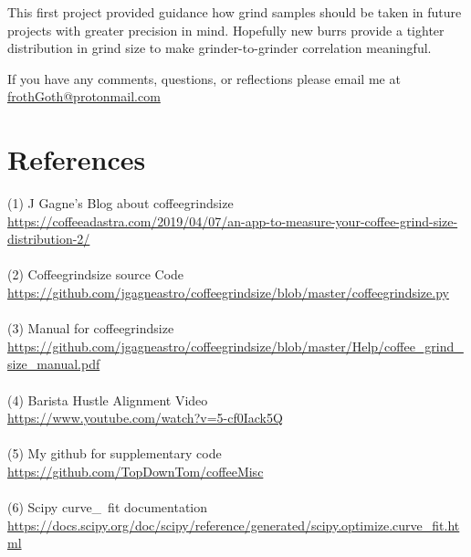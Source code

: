 \documentclass[10pt,a4paper,twocolumn,notitlepage]{article}
\begin{document}
This first project provided guidance how grind samples should be taken in future projects with greater precision in mind. Hopefully new burrs provide a tighter distribution in grind size to make grinder-to-grinder correlation meaningful. 

If you have any comments, questions, or reflections please email me at \url{frothGoth@protonmail.com}

\section{References}
(1) J Gagne's Blog about coffeegrindsize\\
\url{https://coffeeadastra.com/2019/04/07/an-app-to-measure-your-coffee-grind-size-distribution-2/}\\\\
(2) Coffeegrindsize source Code\\
\url{https://github.com/jgagneastro/coffeegrindsize/blob/master/coffeegrindsize.py}\\\\
(3) Manual for coffeegrindsize\\
\url{https://github.com/jgagneastro/coffeegrindsize/blob/master/Help/coffee_grind_size_manual.pdf}\\\\
(4) Barista Hustle Alignment Video\\
\url{https://www.youtube.com/watch?v=5-cf0Iack5Q}\\\\
(5) My github for supplementary code\\
\url{https://github.com/TopDownTom/coffeeMisc}\\\\
(6) Scipy curve\_\ fit documentation\\
\url{https://docs.scipy.org/doc/scipy/reference/generated/scipy.optimize.curve_fit.html}\\\\
\end{document}
